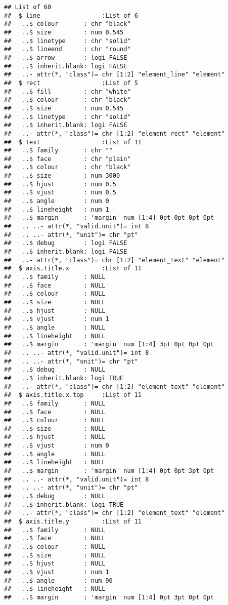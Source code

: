 \documentclass[]{article}
\begin{document}
\begin{verbatim}
## List of 60
##  $ line                 :List of 6
##   ..$ colour       : chr "black"
##   ..$ size         : num 0.545
##   ..$ linetype     : chr "solid"
##   ..$ lineend      : chr "round"
##   ..$ arrow        : logi FALSE
##   ..$ inherit.blank: logi FALSE
##   ..- attr(*, "class")= chr [1:2] "element_line" "element"
##  $ rect                 :List of 5
##   ..$ fill         : chr "white"
##   ..$ colour       : chr "black"
##   ..$ size         : num 0.545
##   ..$ linetype     : chr "solid"
##   ..$ inherit.blank: logi FALSE
##   ..- attr(*, "class")= chr [1:2] "element_rect" "element"
##  $ text                 :List of 11
##   ..$ family       : chr ""
##   ..$ face         : chr "plain"
##   ..$ colour       : chr "black"
##   ..$ size         : num 3000
##   ..$ hjust        : num 0.5
##   ..$ vjust        : num 0.5
##   ..$ angle        : num 0
##   ..$ lineheight   : num 1
##   ..$ margin       : 'margin' num [1:4] 0pt 0pt 0pt 0pt
##   .. ..- attr(*, "valid.unit")= int 8
##   .. ..- attr(*, "unit")= chr "pt"
##   ..$ debug        : logi FALSE
##   ..$ inherit.blank: logi FALSE
##   ..- attr(*, "class")= chr [1:2] "element_text" "element"
##  $ axis.title.x         :List of 11
##   ..$ family       : NULL
##   ..$ face         : NULL
##   ..$ colour       : NULL
##   ..$ size         : NULL
##   ..$ hjust        : NULL
##   ..$ vjust        : num 1
##   ..$ angle        : NULL
##   ..$ lineheight   : NULL
##   ..$ margin       : 'margin' num [1:4] 3pt 0pt 0pt 0pt
##   .. ..- attr(*, "valid.unit")= int 8
##   .. ..- attr(*, "unit")= chr "pt"
##   ..$ debug        : NULL
##   ..$ inherit.blank: logi TRUE
##   ..- attr(*, "class")= chr [1:2] "element_text" "element"
##  $ axis.title.x.top     :List of 11
##   ..$ family       : NULL
##   ..$ face         : NULL
##   ..$ colour       : NULL
##   ..$ size         : NULL
##   ..$ hjust        : NULL
##   ..$ vjust        : num 0
##   ..$ angle        : NULL
##   ..$ lineheight   : NULL
##   ..$ margin       : 'margin' num [1:4] 0pt 0pt 3pt 0pt
##   .. ..- attr(*, "valid.unit")= int 8
##   .. ..- attr(*, "unit")= chr "pt"
##   ..$ debug        : NULL
##   ..$ inherit.blank: logi TRUE
##   ..- attr(*, "class")= chr [1:2] "element_text" "element"
##  $ axis.title.y         :List of 11
##   ..$ family       : NULL
##   ..$ face         : NULL
##   ..$ colour       : NULL
##   ..$ size         : NULL
##   ..$ hjust        : NULL
##   ..$ vjust        : num 1
##   ..$ angle        : num 90
##   ..$ lineheight   : NULL
##   ..$ margin       : 'margin' num [1:4] 0pt 3pt 0pt 0pt

\end{verbatim}
\end{document}
